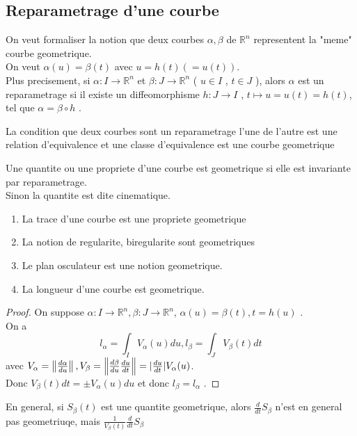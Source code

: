 \documentclass[../main.tex]{subfiles}
\begin{document}
\subsection{Reparametrage d'une courbe}
On veut formaliser la notion que deux courbes $ \alpha, \beta$ de $ \mathbb{R}^{n}$ representent la "meme" courbe geometrique.\\
On veut $ \alpha( u) = \beta( t) $ avec $u = h( t)  ( =u(t) ) $.\\
Plus precisement, si $\alpha: I \to \mathbb{R}^n$ et $ \beta : J \to \mathbb{R}^n$ ( $u \in I$ , $t \in J$ ), alors $\alpha$ est un reparametrage si il existe un diffeomorphisme $ h : J \to I$ , $t \mapsto u = u( t) =h( t) $, tel que $\alpha= \beta \circ h$ .\\
\begin{rmq}
La condition que deux courbes sont un reparametrage l'une de l'autre est une relation d'equivalence et une classe d'equivalence est une courbe geometrique
\end{rmq}
\begin{defn}[Quantite]
	Une quantite ou une propriete d'une courbe est geometrique si elle est invariante par reparametrage.\\
	Sinon la quantite est dite cinematique.
\end{defn}
\begin{exemple}
\begin{enumerate}
\item La trace d'une courbe est une propriete geometrique
\item La notion de regularite, biregularite sont geometriques
\item Le plan osculateur est une notion geometrique.
\item La longueur d'une courbe est geometrique.
\end{enumerate}
\end{exemple}
\begin{proof}
	On suppose $\alpha: I \to \mathbb{R}^n, \beta: J \to \mathbb{R}^n$, $\alpha( u) = \beta( t) , t=h( u) $ .\\
	On a 
	\[ 
		l_\alpha = \int_I V_\alpha ( u)  du, l_{\beta} = \int_J V_{\beta} ( t) dt
	\]
	avec $ V_{\alpha} = \left\lVert \frac{d\alpha}{du}\right\rVert , V_{\beta} = \left\lVert \frac{d \beta}{du} \frac{du}{dt}\right\rVert = | \frac{du}{dt}| V_{\alpha} ( u)  $.\\
	Donc $V_{\beta} ( t) dt = \pm V_{\alpha} ( u) du$ et donc $l_{\beta} = l_{\alpha} $ .
\end{proof}
En general, si $S_{\beta} ( t) $ est une quantite geometrique, alors $ \frac{d}{dt} S_{\beta} $ n'est en general pas geometriuqe, mais $ \frac{1}{V_{\beta} ( t) } \frac{d}{dt}S_{\beta} $ 
\end{document}
